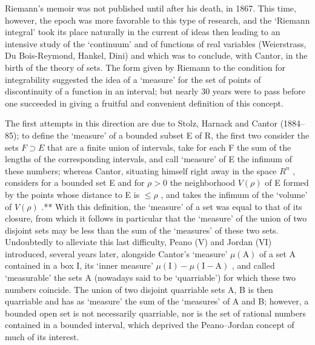 Riemann's memoir was not published until after his death, in 1867. This time, however, the epoch was more favorable to this type of research, and the `Riemann integral' took its place naturally in the current of ideas then leading to an intensive study of the `continuum' and of functions of real variables (Weierstrass, Du Bois-Reymond, Hankel, Dini) and which was to conclude, with Cantor, in the birth of the theory of sets. The form given by Riemann to the condition for integrability suggested the idea of a `measure' for the set of points of discontinuity of a function in an interval; but nearly 30 years were to pass before one succeeded in giving a fruitful and convenient definition of this concept.

The first attempts in this direction are due to Stolz, Harnack and Cantor (1884--85); to define the `measure' of a bounded subset E of R, the first two consider the sets \(F \supset E\) that are a finite union of intervals, take for each F the sum of the lengths of the corresponding intervals, and call `measure' of E the infimum of these numbers; whereas Cantor, situating himself right away in the space \(R^{n}\) , considers for a bounded set E and for \(\rho > 0\) the neighborhood \(V(\rho)\) of E formed by the points whose distance to E is \(\leqslant \rho\) , and takes the infimum of the `volume' of \(V(\rho)\) .** With this definition, the `measure' of a set was equal to that of its closure, from which it follows in particular that the `measure' of the union of two disjoint sets may be less than the sum of the `measures' of these two sets. Undoubtedly to alleviate this last difficulty, Peano (V) and Jordan (VI) introduced, several years later, alongside Cantor's `measure' \(\mu(\mathrm{A})\) of a set A contained in a box I, its `inner measure' \(\mu(\mathrm{I}) - \mu(\mathrm{I} - \mathrm{A})\) , and called `measurable' the sets A (nowadays said to be `quarriable') for which these two numbers coincide. The union of two disjoint quarriable sets A, B is then quarriable and has as `measure' the sum of the `measures' of A and B; however, a bounded open set is not necessarily quarriable, nor is the set of rational numbers contained in a bounded interval, which deprived the Peano--Jordan concept of much of its interest.

